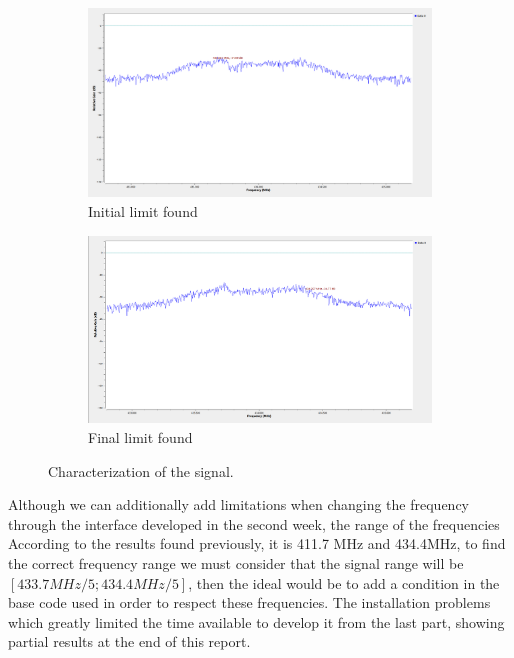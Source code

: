 \documentclass[12pt, twoside]{report}
\begin{document}
\begin{figure}
     \centering
     \begin{subfigure}[b]{0.8\textwidth}
         \centering
         \includegraphics[width=\textwidth]{images/result1.png}
         \caption{Initial limit found}
         \label{fig:Result1}
     \end{subfigure}
     \hfill
     \begin{subfigure}[b]{0.8\textwidth}
         \centering
         \includegraphics[width=\textwidth]{images/result2.png}
         \caption{Final limit found}
         \label{fig:Result2}
     \end{subfigure}
     \hfill
        \caption{Characterization of the signal.}
        \label{fig:three graphs}
\end{figure}

Although we can additionally add limitations when changing the frequency through the interface developed in the second week, the range of the frequencies According to the results found previously, it is 411.7 MHz and 434.4MHz, to find the correct frequency range we must consider that the signal range will be $[433.7MHz/5 ; 434.4MHz/5]$, then the ideal would be to add a condition in the base code used in order to respect these frequencies. The installation problems  which greatly limited the time available to develop it from the last part, showing partial results at the end of this report.
\end{document}
